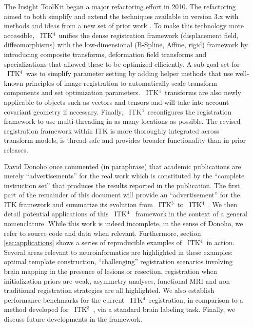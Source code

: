 \documentclass{frontiersSCNS}
\newcommand{\tk}{~ITK$^{\text{4}}$~}
\newcommand{\tkt}{~ITK$^{\text{3}}$~}
\begin{document}
The Insight ToolKit began a major refactoring effort in 2010.
The refactoring aimed to both simplify and extend the techniques available in version
3.x with methods and ideas from a new set of prior work
\cite{Jenkinson2001,Christensen1996,Rueckert1999,Miller2005,Peyrat2010,Avants2011}.
To make this technology more accessible, \tk unifies the dense
registration framework (displacement field, diffeomorphisms)
with the low-dimensional (B-Spline, Affine, rigid) framework by
introducing composite transforms, deformation field transforms and
specializations that allowed these to be optimized efficiently.  A sub-goal set for \tk was to simplify
parameter setting by adding helper methods that use well-known
principles of image registration to automatically scale transform
components and set optimization parameters.  \tk transforms are also
newly applicable to objects such as vectors and tensors and will take into account covariant geometry if
necessary.  Finally, \tk reconfigures the registration framework
to use multi-threading in as many locations as possible.
The revised registration framework within ITK is more thoroughly
integrated across transform models, is thread-safe and provides
broader functionality than in prior releases. 




David Donoho once commented (in paraphrase) that academic publications
are merely ``advertisements'' for the real work which is constituted
by the ``complete instruction set'' that produces the results reported
in the publication.  The first part of the remainder of this document will provide an
``advertisement'' for the ITK framework and summarize its evolution
from \tkt to \tk.  We then detail potential applications of this \tk
framework in the context of a general nomenclature.  While this work is indeed incomplete, in the
sense of Donoho, we refer to source code and data when relevant.
Furthermore, section \ref{sec:applications} shows a series of
reproducible examples of \tk in action.  Several
areas relevant to neuroinformatics are highlighted in these examples: optimal template
construction, ``challenging'' registration scenarios involving brain
mapping in the presence of lesions or resection, registration when
initialization priors are weak, asymmetry analyses, functional MRI and
non-traditional registration strategies are all highlighted.  We also
establish performance benchmarks for the current \tk registration, in
comparison to a method developed for \tkt, via
a standard brain labeling task.  Finally, we discuss future developments
in the framework.
\end{document}
